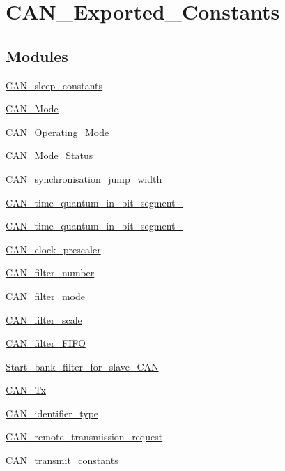 \hypertarget{group__CAN__Exported__Constants}{
\section{CAN\_\-Exported\_\-Constants}
\label{group__CAN__Exported__Constants}
}
\subsection*{Modules}
\begin{DoxyCompactItemize}
\item 
\hyperlink{group__CAN__sleep__constants}{CAN\_\-sleep\_\-constants}
\item 
\hyperlink{group__CAN__Mode}{CAN\_\-Mode}
\item 
\hyperlink{group__CAN__Operating__Mode}{CAN\_\-Operating\_\-Mode}
\item 
\hyperlink{group__CAN__Mode__Status}{CAN\_\-Mode\_\-Status}
\item 
\hyperlink{group__CAN__synchronisation__jump__width}{CAN\_\-synchronisation\_\-jump\_\-width}
\item 
\hyperlink{group__CAN__time__quantum__in__bit__segment__1}{CAN\_\-time\_\-quantum\_\-in\_\-bit\_\-segment\_}
\item 
\hyperlink{group__CAN__time__quantum__in__bit__segment__2}{CAN\_\-time\_\-quantum\_\-in\_\-bit\_\-segment\_}
\item 
\hyperlink{group__CAN__clock__prescaler}{CAN\_\-clock\_\-prescaler}
\item 
\hyperlink{group__CAN__filter__number}{CAN\_\-filter\_\-number}
\item 
\hyperlink{group__CAN__filter__mode}{CAN\_\-filter\_\-mode}
\item 
\hyperlink{group__CAN__filter__scale}{CAN\_\-filter\_\-scale}
\item 
\hyperlink{group__CAN__filter__FIFO}{CAN\_\-filter\_\-FIFO}
\item 
\hyperlink{group__Start__bank__filter__for__slave__CAN}{Start\_\-bank\_\-filter\_\-for\_\-slave\_\-CAN}
\item 
\hyperlink{group__CAN__Tx}{CAN\_\-Tx}
\item 
\hyperlink{group__CAN__identifier__type}{CAN\_\-identifier\_\-type}
\item 
\hyperlink{group__CAN__remote__transmission__request}{CAN\_\-remote\_\-transmission\_\-request}
\item 
\hyperlink{group__CAN__transmit__constants}{CAN\_\-transmit\_\-constants}

\end{DoxyCompactItemize}
